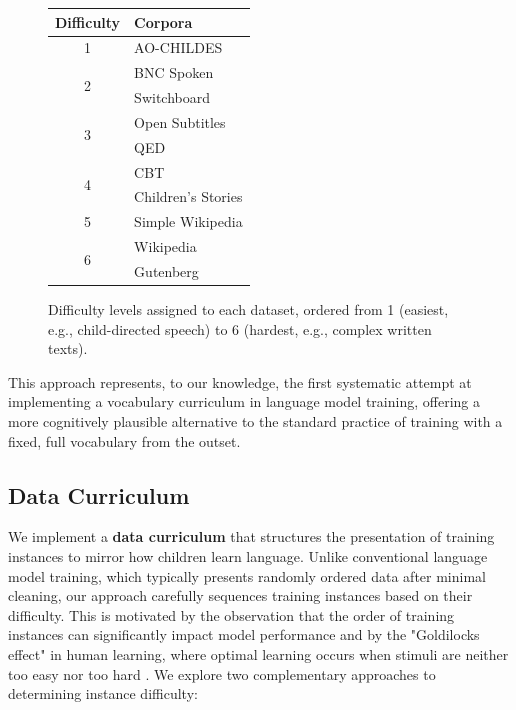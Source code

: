 \begin{figure}    
    \centering
    \small
    \renewcommand{\arraystretch}{1}
    \begin{tabular}{cl}
    \toprule
    \textbf{Difficulty} & \textbf{Corpora} \\
    \midrule
    1 & AO-CHILDES \\
    \midrule
    \multirow{2}{*}{2} & BNC Spoken \\
                           & Switchboard \\
    \midrule
    \multirow{2}{*}{3} & Open Subtitles \\
                           & QED \\
    \midrule
    \multirow{2}{*}{4} & CBT \\
                           & Children's Stories \\
    \midrule
    5 & Simple Wikipedia \\
    \midrule
    \multirow{2}{*}{6} & Wikipedia \\
                           & Gutenberg \\
    \bottomrule
    \end{tabular}
    \caption{\label{tbl:source_order} Difficulty levels assigned to each dataset, ordered from 1 (easiest, e.g., child-directed speech) to 6 (hardest, e.g., complex written texts).}
    \vspace{-2em} %
\end{figure}

This approach represents, to our knowledge, the first systematic attempt at implementing a vocabulary curriculum in language model training, offering a more cognitively plausible alternative to the standard practice of training with a fixed, full vocabulary from the outset.

\subsection{Data Curriculum}
\label{subsec:data-cl}

We implement a \textbf{data curriculum} that structures the presentation of training instances to mirror how children learn language. Unlike conventional language model training, which typically presents randomly ordered data after minimal cleaning, our approach carefully sequences training instances based on their difficulty. This is motivated by the observation that the order of training instances can significantly impact model performance \citep{schluter2018data} and by the "Goldilocks effect" in human learning, where optimal learning occurs when stimuli are neither too easy nor too hard \cite{kidd2012goldilocks}. We explore two complementary approaches to determining instance difficulty:


